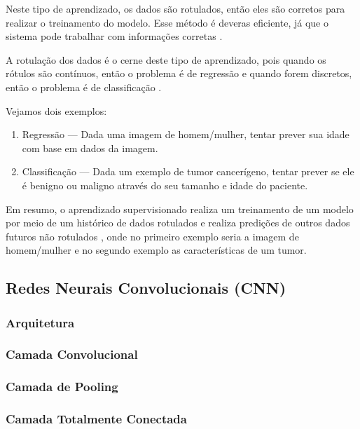Neste tipo de aprendizado, os dados são rotulados, então eles são corretos para realizar o treinamento do modelo. Esse método é deveras eficiente, já que o sistema pode trabalhar com informações corretas \cite{russell2002artificial}. 

A rotulação dos dados é o cerne deste tipo de aprendizado, pois quando os rótulos são contínuos, então o problema é de regressão e quando forem discretos, então o problema é de classificação \cite{russell2002artificial}.

Vejamos dois exemplos:
\begin{enumerate}
    \item Regressão — Dada uma imagem de homem/mulher, tentar prever sua idade com base em dados da imagem.
    \item Classificação — Dada um exemplo de tumor cancerígeno, tentar prever se ele é benigno ou maligno através do seu tamanho e idade do paciente.
\end{enumerate}

Em resumo, o aprendizado supervisionado realiza um treinamento de um modelo por meio de um histórico de dados rotulados e realiza predições de outros dados futuros não rotulados \cite{santos2018identificaccao}, onde no primeiro exemplo seria a imagem de homem/mulher e no segundo exemplo as características de um tumor.

\subsection{Redes Neurais Convolucionais (CNN)}
\subsubsection{Arquitetura}
\subsubsection{Camada Convolucional}
\subsubsection{Camada de Pooling}
\subsubsection{Camada Totalmente Conectada}
